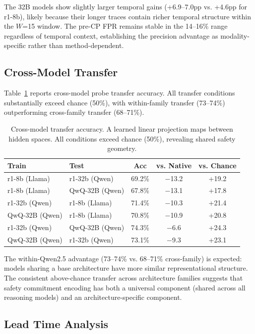 \documentclass[11pt,a4paper]{article}
\begin{document}
The 32B models show slightly larger temporal gains (+6.9--7.0pp vs. +4.6pp for r1-8b), likely because their longer traces contain richer temporal structure within the $W$=15 window. The pre-CP FPR remains stable in the 14--16\% range regardless of temporal context, establishing the precision advantage as modality-specific rather than method-dependent.

\subsection{Cross-Model Transfer}

Table~\ref{tab:transfer} reports cross-model probe transfer accuracy. All transfer conditions substantially exceed chance (50\%), with within-family transfer (73--74\%) outperforming cross-family transfer (68--71\%).

\begin{table}[t]
\centering
\small
\caption{Cross-model transfer accuracy. A learned linear projection maps between hidden spaces. All conditions exceed chance (50\%), revealing shared safety geometry.}
\label{tab:transfer}
\begin{tabular}{llccc}
\toprule
Train & Test & Acc & vs. Native & vs. Chance \\
\midrule
r1-8b (Llama) & r1-32b (Qwen) & 69.2\% & $-$13.2 & +19.2 \\
r1-8b (Llama) & QwQ-32B (Qwen) & 67.8\% & $-$13.1 & +17.8 \\
r1-32b (Qwen) & r1-8b (Llama) & 71.4\% & $-$10.3 & +21.4 \\
QwQ-32B (Qwen) & r1-8b (Llama) & 70.8\% & $-$10.9 & +20.8 \\
r1-32b (Qwen) & QwQ-32B (Qwen) & 74.3\% & $-$6.6 & +24.3 \\
QwQ-32B (Qwen) & r1-32b (Qwen) & 73.1\% & $-$9.3 & +23.1 \\
\bottomrule
\end{tabular}
\end{table}

The within-Qwen2.5 advantage (73--74\% vs. 68--71\% cross-family) is expected: models sharing a base architecture have more similar representational structure. The consistent above-chance transfer across architecture families suggests that safety commitment encoding has both a universal component (shared across all reasoning models) and an architecture-specific component.

\subsection{Lead Time Analysis}
\end{document}
